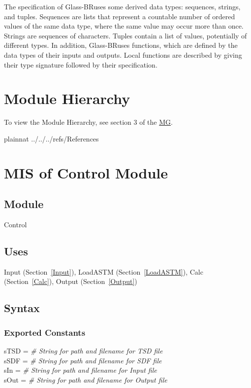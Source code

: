\documentclass[12pt, titlepage]{article}
\newcommand{\progname}[1]{Glass-BR}
\begin{document}
\noindent
The specification of \progname \ uses some derived data types: sequences, strings, and
tuples. Sequences are lists that represent a countable number of ordered values of the same data type, where 
the same value may occur more than once. Strings are sequences of characters. 
Tuples contain a list of values, potentially of different types. 
In addition, \progname \ uses functions, which
are defined by the data types of their inputs and outputs. Local functions are
described by giving their type signature followed by their specification.

\section{Module Hierarchy} 

To view the Module Hierarchy, see section 3 of the \href{../MG/glassbr_mg.pdf}{MG}.

 {plainnat}
 {../../../refs/References}

\newpage


\section{MIS of Control Module} \label{Main}

\subsection{Module}

Control

\subsection{Uses}

Input (Section~\ref{Input}), LoadASTM (Section~\ref{LoadASTM}), Calc
(Section~\ref{Calc}), Output (Section~\ref{Output})

\subsection{Syntax}

\subsubsection {Exported Constants}

sTSD = \textit{\# String for path and filename for TSD file}\\
sSDF = \textit{\# String for path and filename for SDF file}\\
sIn = \textit{\# String for path and filename for Input file}\\
sOut = \textit{\# String for path and filename for Output file}
\end{document}
